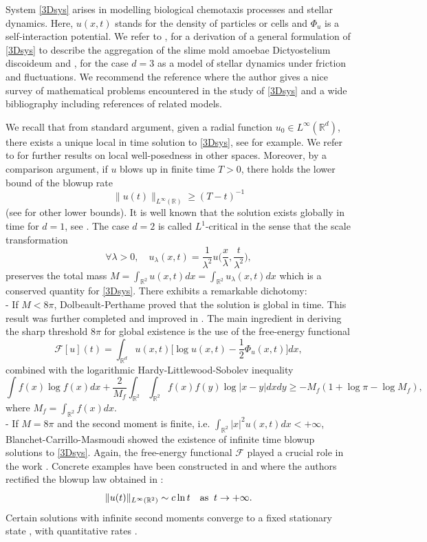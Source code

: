 \documentclass[11pt]{aims}
\theoremstyle{definition}
\newcommand{\Rb}{\mathbb{R}}
\newcommand{\Fc}{\mathcal{F}}
\newcommand{\be}{\begin{equation}}
\newcommand{\ee}{\end{equation}}
\numberwithin{equation}{section}
\begin{document}
\noindent System \eqref{3Dsys} arises in modelling biological chemotaxis processes and stellar dynamics. Here, $u(x,t)$ stands for the density of particles or cells and $\Phi_u$ is a self-interaction potential. We refer to \cite{KSjtb70}, \cite{KSjtb71a} \cite{KSjtb71b} for a derivation of a general formulation of \eqref{3Dsys} to describe the aggregation of the slime mold amoebae Dictyostelium discoideum and \cite{Warma92}, \cite{Wjam92} for the case $d=3$ as a model of stellar dynamics under friction and fluctuations. We recommend the reference \cite{Hjdmv03} where the author gives a nice survey of mathematical problems encountered in the study of \eqref{3Dsys} and a wide bibliography including references of related models. 

We recall that from standard argument, given a radial function $u_0\in L^\infty(\mathbb R^d)$, there exists a unique local in time solution to \eqref{3Dsys}, see \cite{GMSarma11} for example. We refer to \cite{B} for further results on local well-posedness in other spaces. Moreover, by a comparison argument, if $u$ blows up in finite time $T>0$, there holds the lower bound of the blowup rate
$$
\| u (t)\|_{L^\infty(\mathbb R)}\geq (T-t)^{-1}
$$
(see \cite{Ko} for other lower bounds). It is well known that the solution exists globally in time for $d=1$, see \cite{Namsa95}. The case $d=2$ is called $L^1$-critical in the sense that  the scale transformation 
\be \label{id:scaling}
\forall \lambda > 0, \quad  u_\lambda(x,t) = \frac{1}{\lambda^2}u\Big(\frac{x}{\lambda}, \frac{t}{\lambda^2} \Big), 
\ee
preserves the total mass $M = \int_{\Rb^2} u(x,t)dx = \int_{\Rb^2}u_\lambda(x,t) dx$ which is a conserved quantity for \eqref{3Dsys}. There exhibits a remarkable dichotomy:\\
- If $M < 8\pi$, Dolbeault-Perthame \cite{DPcrasp04} proved that the solution is global in time. This result was further completed and improved in \cite{BDPjde06}. The main ingredient in deriving the sharp threshold $8\pi$ for global existence is the use of the free-energy functional
\begin{equation}\label{def:Fcu}
\Fc[u](t) = 	\int_{\Rb^d}  u(x,t) \Big[\log u(x,t)  - \frac{1}{2}\Phi_u(x,t)\Big] dx,
\end{equation}
combined with the logarithmic Hardy-Littlewood-Sobolev inequality 
$$\int f(x) \log f(x) dx  + \frac{2}{M_f} \int_{\Rb^2}\int_{\Rb^2} f(x)f(y) \log|x-y| dx dy \geq - M_f(1 + \log \pi - \log M_f),$$
where $M_f = \int_{\Rb^2} f(x) dx.$\\
- If $M = 8\pi$ and the second moment is finite, i.e. $\int_{\Rb^2} |x|^2 u(x,t) dx < +\infty$, Blanchet-Carrillo-Masmoudi \cite{BCMcpam08} showed the existence
of infinite time blowup solutions to \eqref{3Dsys}. Again, the free-energy functional $\Fc$ played a crucial role in the work \cite{BCMcpam08}. Concrete examples have been constructed in \cite{GMcpam18} and \cite{DPDMWarx19} where the authors rectified the blowup law obtained in \cite{Snon07}: 
$$\|u(t)\|_{L^\infty(\Rb^2)} \sim c \ln t \quad \textup{as}\;\; t \to +\infty.$$
Certain solutions with infinite second moments converge to a fixed stationary state \cite{BCCjfa12}, with quantitative rates \cite{CaFi}.
\end{document}
